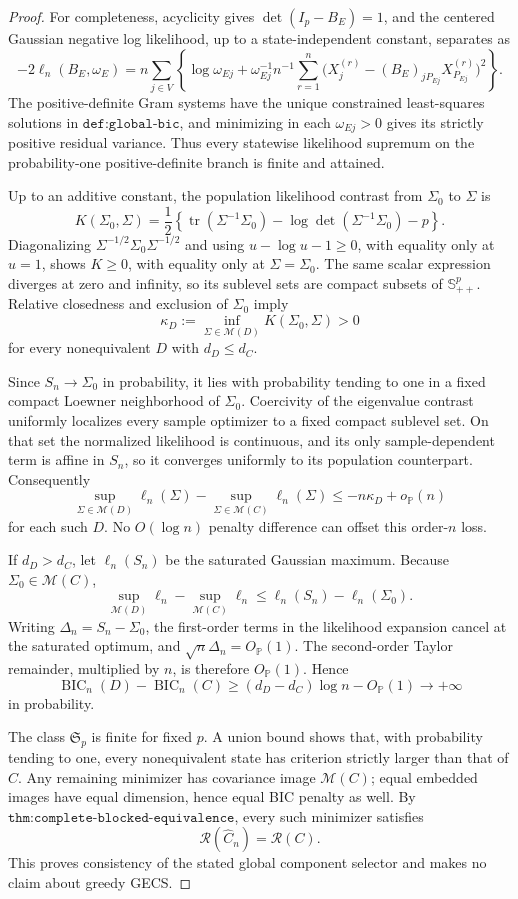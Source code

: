 \documentclass{article}
\begin{document}
\begin{proof}
For completeness, acyclicity gives \(\det(I_p-B_E)=1\), and the centered Gaussian negative log likelihood, up to a state-independent constant, separates as
\[
 -2\ell_n(B_E,\omega_E)
 =n\sum_{j\in V}\left\{\log\omega_{Ej}
 +\omega_{Ej}^{-1}n^{-1}\sum_{r=1}^n
 \bigl(X_j^{(r)}-(B_E)_{jP_{Ej}}X_{P_{Ej}}^{(r)}\bigr)^2\right\}.
\]
The positive-definite Gram systems have the unique constrained least-squares solutions in \(\texttt{def:global-bic}\), and minimizing in each \(\omega_{Ej}>0\) gives its strictly positive residual variance. Thus every statewise likelihood supremum on the probability-one positive-definite branch is finite and attained.

Up to an additive constant, the population likelihood contrast from \(\Sigma_0\) to \(\Sigma\) is
\[
 K(\Sigma_0,\Sigma)=\frac12\left\{
 \operatorname{tr}(\Sigma^{-1}\Sigma_0)
 -\log\det(\Sigma^{-1}\Sigma_0)-p\right\}.
\]
Diagonalizing \(\Sigma^{-1/2}\Sigma_0\Sigma^{-1/2}\) and using \(u-\log u-1\geq0\), with equality only at \(u=1\), shows \(K\geq0\), with equality only at \(\Sigma=\Sigma_0\). The same scalar expression diverges at zero and infinity, so its sublevel sets are compact subsets of \(\mathbb S^p_{++}\). Relative closedness and exclusion of \(\Sigma_0\) imply
\[
 \kappa_D:=\inf_{\Sigma\in\mathcal M(D)}K(\Sigma_0,\Sigma)>0
\]
for every nonequivalent \(D\) with \(d_D\leq d_C\).

Since \(S_n\to\Sigma_0\) in probability, it lies with probability tending to one in a fixed compact Loewner neighborhood of \(\Sigma_0\). Coercivity of the eigenvalue contrast uniformly localizes every sample optimizer to a fixed compact sublevel set. On that set the normalized likelihood is continuous, and its only sample-dependent term is affine in \(S_n\), so it converges uniformly to its population counterpart. Consequently
\[
 \sup_{\Sigma\in\mathcal M(D)}\ell_n(\Sigma)
 -\sup_{\Sigma\in\mathcal M(C)}\ell_n(\Sigma)
 \leq -n\kappa_D+o_{\mathbb P}(n)
\]
for each such \(D\). No \(O(\log n)\) penalty difference can offset this order-\(n\) loss.

If \(d_D>d_C\), let \(\ell_n(S_n)\) be the saturated Gaussian maximum. Because \(\Sigma_0\in\mathcal M(C)\),
\[
 \sup_{\mathcal M(D)}\ell_n-\sup_{\mathcal M(C)}\ell_n
 \leq \ell_n(S_n)-\ell_n(\Sigma_0).
\]
Writing \(\Delta_n=S_n-\Sigma_0\), the first-order terms in the likelihood expansion cancel at the saturated optimum, and \(\sqrt n\Delta_n=O_{\mathbb P}(1)\). The second-order Taylor remainder, multiplied by \(n\), is therefore \(O_{\mathbb P}(1)\). Hence
\[
 \operatorname{BIC}_n(D)-\operatorname{BIC}_n(C)
 \geq(d_D-d_C)\log n-O_{\mathbb P}(1)
 \longrightarrow+\infty
\]
in probability.

The class \(\mathfrak S_p\) is finite for fixed \(p\). A union bound shows that, with probability tending to one, every nonequivalent state has criterion strictly larger than that of \(C\). Any remaining minimizer has covariance image \(\mathcal M(C)\); equal embedded images have equal dimension, hence equal BIC penalty as well. By \(\texttt{thm:complete-blocked-equivalence}\), every such minimizer satisfies
\[
 \mathcal R(\widehat C_n)=\mathcal R(C).
\]
This proves consistency of the stated global component selector and makes no claim about greedy GECS.
\end{proof}
\end{document}
